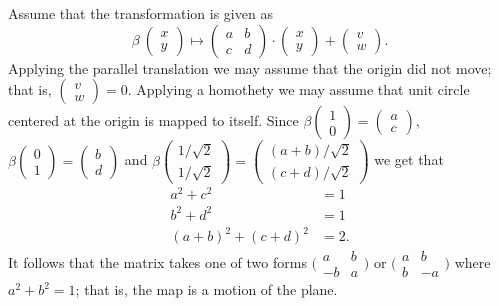 {Assume that the transformation is given as
\[\beta\:\left(\begin{smallmatrix}
x\\ y
\end{smallmatrix} \right)
  \mapsto
  \left(\begin{smallmatrix}
a&b\\ c&d
\end{smallmatrix} \right)
  \cdot
  \left(\begin{smallmatrix}
x\\ y
\end{smallmatrix} \right)
  +
\left(\begin{smallmatrix}
v\\ w
\end{smallmatrix} \right).
\]
Applying the parallel translation we may assume that the origin did not move; 
that is, $\left(\begin{smallmatrix}
v\\ w
\end{smallmatrix} \right)=0$.
Applying a homothety we may assume that unit circle centered at the origin is mapped to itself.
Since $\beta\left(\begin{smallmatrix}
1\\ 0
\end{smallmatrix} \right)
=
\left(\begin{smallmatrix}
a\\c 
\end{smallmatrix} \right)$,
$\beta\left(\begin{smallmatrix}
0\\ 1
\end{smallmatrix} \right)
=
\left(\begin{smallmatrix}
b\\d 
\end{smallmatrix} \right)$ 
and 
$\beta\left(\begin{smallmatrix}
1/\sqrt{2}\\ 1/\sqrt{2}
\end{smallmatrix} \right)
=
\left(\begin{smallmatrix}
(a+b)/\sqrt{2}\\(c+d)/\sqrt{2} 
\end{smallmatrix} \right)$
we get that
\begin{align*}
a^2+c^2&=1\\
b^2+d^2&=1\\
(a+b)^2+(c+d)^2&=2.
\end{align*}
It follows that the matrix takes one of two forms $\bigl(\begin{smallmatrix}
a&b\\ -b&a
\end{smallmatrix} \bigr)$
or 
$\bigl(\begin{smallmatrix}
a&b\\ b&-a
\end{smallmatrix} \bigr)$ where $a^2+b^2=1$;
that is, the map is a motion of the plane.




}
